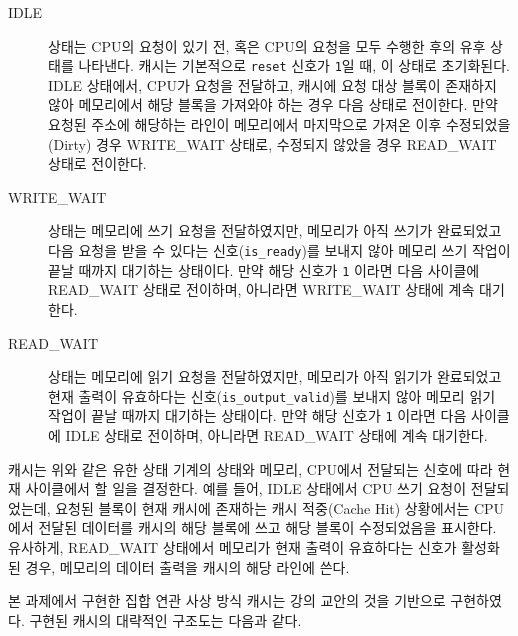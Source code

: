 \documentclass[openright, a4paper]{article}
\newcommand{\code}[1]{\texttt{#1}}
\begin{document}
\begin{description}
  \item[IDLE]상태는 CPU의 요청이 있기 전, 혹은 CPU의 요청을 모두 수행한 후의
  유후 상태를 나타낸다. 캐시는 기본적으로 \code{reset} 신호가 \code{1}일 때,
  이 상태로 초기화된다. IDLE 상태에서, CPU가 요청을 전달하고, 캐시에 요청 대상
  블록이 존재하지 않아 메모리에서 해당 블록을 가져와야 하는 경우 다음 상태로
  전이한다. 만약 요청된 주소에 해당하는 라인이 메모리에서 마지막으로 가져온 이후
  수정되었을(Dirty) 경우 WRITE_WAIT 상태로, 수정되지 않았을 경우 READ_WAIT 상태로
  전이한다.

  \item[WRITE_WAIT]상태는 메모리에 쓰기 요청을 전달하였지만, 메모리가 아직 쓰기가
  완료되었고 다음 요청을 받을 수 있다는 신호(\code{is_ready})를 보내지 않아
  메모리 쓰기 작업이 끝날 때까지 대기하는 상태이다. 만약 해당 신호가 
  \code{1} 이라면 다음 사이클에 READ_WAIT 상태로 전이하며, 아니라면 WRITE_WAIT
  상태에 계속 대기한다.

  \item[READ_WAIT]상태는 메모리에 읽기 요청을 전달하였지만, 메모리가 아직 읽기가
  완료되었고 현재 출력이 유효하다는 신호(\code{is_output_valid})를 보내지 않아
  메모리 읽기 작업이 끝날 때까지 대기하는 상태이다. 만약 해당 신호가 \code{1}
  이라면 다음 사이클에 IDLE 상태로 전이하며, 아니라면 READ_WAIT 상태에 계속 
  대기한다.
\end{description}

캐시는 위와 같은 유한 상태 기계의 상태와 메모리, CPU에서 전달되는 신호에 따라
현재 사이클에서 할 일을 결정한다. 예를 들어, IDLE 상태에서 CPU 쓰기 요청이
전달되었는데, 요청된 블록이 현재 캐시에 존재하는 캐시 적중(Cache Hit) 상황에서는
CPU에서 전달된 데이터를 캐시의 해당 블록에 쓰고 해당 블록이 수정되었음을 
표시한다. 유사하게, READ_WAIT 상태에서 메모리가 현재 출력이 유효하다는 신호가
활성화된 경우, 메모리의 데이터 출력을 캐시의 해당 라인에 쓴다.

본 과제에서 구현한 집합 연관 사상 방식 캐시는 강의 교안의 것을 기반으로
구현하였다. 구현된 캐시의 대략적인 구조도는 다음과 같다.

\hfill
\end{document}
